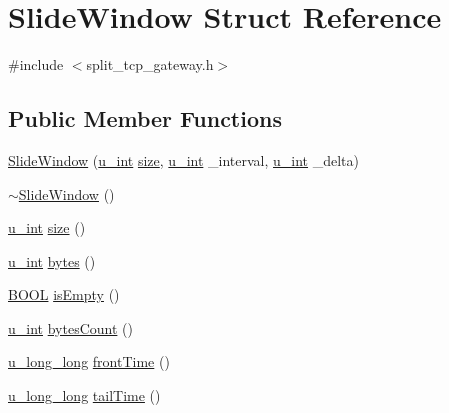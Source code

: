 \hypertarget{structSlideWindow}{\section{\-Slide\-Window \-Struct \-Reference}
\label{structSlideWindow}
}


{\ttfamily \#include $<$split\-\_\-tcp\-\_\-gateway.\-h$>$}

\subsection*{\-Public \-Member \-Functions}
\begin{DoxyCompactItemize}
\item 
\hyperlink{structSlideWindow_af3f608e78c352ca987d7584cb9383cd5}{\-Slide\-Window} (\hyperlink{split__tcp__gateway_8h_ac319c165d52643e43249fe003e18bdf3}{u\-\_\-int} \hyperlink{structSlideWindow_a88c69cd1183ae70c3d09ab252df7c38f}{size}, \hyperlink{split__tcp__gateway_8h_ac319c165d52643e43249fe003e18bdf3}{u\-\_\-int} \-\_\-interval, \hyperlink{split__tcp__gateway_8h_ac319c165d52643e43249fe003e18bdf3}{u\-\_\-int} \-\_\-delta)
\item 
\hyperlink{structSlideWindow_acdf4f09254d2d9d9cc8b06a2efe5bf68}{$\sim$\-Slide\-Window} ()
\item 
\hyperlink{split__tcp__gateway_8h_ac319c165d52643e43249fe003e18bdf3}{u\-\_\-int} \hyperlink{structSlideWindow_a88c69cd1183ae70c3d09ab252df7c38f}{size} ()
\item 
\hyperlink{split__tcp__gateway_8h_ac319c165d52643e43249fe003e18bdf3}{u\-\_\-int} \hyperlink{structSlideWindow_a52ab3c3d01750d81b6358db65e4e6146}{bytes} ()
\item 
\hyperlink{split__tcp__gateway_8h_a050c65e107f0c828f856a231f4b4e788}{\-B\-O\-O\-L} \hyperlink{structSlideWindow_aab9759f652d68733e974dedcae3e23b5}{is\-Empty} ()
\item 
\hyperlink{split__tcp__gateway_8h_ac319c165d52643e43249fe003e18bdf3}{u\-\_\-int} \hyperlink{structSlideWindow_abd00c475ba43503b4c15e08488669efb}{bytes\-Count} ()
\item 
\hyperlink{split__tcp__gateway_8h_ae16666ecf73bb70201bc64a6ccc329f1}{u\-\_\-long\-\_\-long} \hyperlink{structSlideWindow_ad247dbb8b5c4ddff2784c63469bb7efe}{front\-Time} ()
\item 
\hyperlink{split__tcp__gateway_8h_ae16666ecf73bb70201bc64a6ccc329f1}{u\-\_\-long\-\_\-long} \hyperlink{structSlideWindow_acea36a8d11e07653a253aa66580a0945}{tail\-Time} ()
\item 

\end{DoxyCompactItemize}
